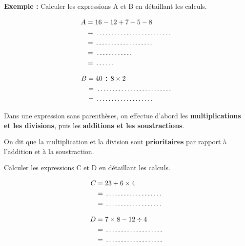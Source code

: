 \begin{examplebox}
\textbf{Exemple :} Calculer les expressions A et B en détaillant les calculs.

\begin{minipage}[t]{0.48\textwidth}
\begin{align*}
A &= 16 - 12 + 7 + 5 - 8 \\
&= \trous{4cm} \\
&= \trous{3cm} \\
&= \trous{2cm} \\
&= \trous{1cm}
\end{align*}
\end{minipage}
\hfill
\begin{minipage}[t]{0.48\textwidth}
\begin{align*}
B &= 40 \div 8 \times 2 \\
&= \trous{4cm} \\
&= \trous{3cm}
\end{align*}
\end{minipage}
\end{examplebox}

\begin{proprietebox}
Dans une expression sans parenthèses, on effectue d'abord les \textbf{multiplications et les divisions}, puis les \textbf{additions et les soustractions}. 

On dit que la multiplication et la division sont \textbf{prioritaires} par rapport à l'addition et à la soustraction.
\end{proprietebox}

\begin{examplebox}
Calculer les expressions C et D en détaillant les calculs.

\begin{minipage}[t]{0.48\textwidth}
\begin{align*}
C &= 23 + 6 \times 4 \\
&= \trous{3cm} \\
&= \trous{3cm}
\end{align*}
\end{minipage}
\begin{minipage}[t]{0.48\textwidth}
\begin{align*}
D &= 7 \times 8 - 12 \div 4 \\
&= \trous{3cm} \\
&= \trous{3cm}
\end{align*}
\end{minipage}
\end{examplebox}

